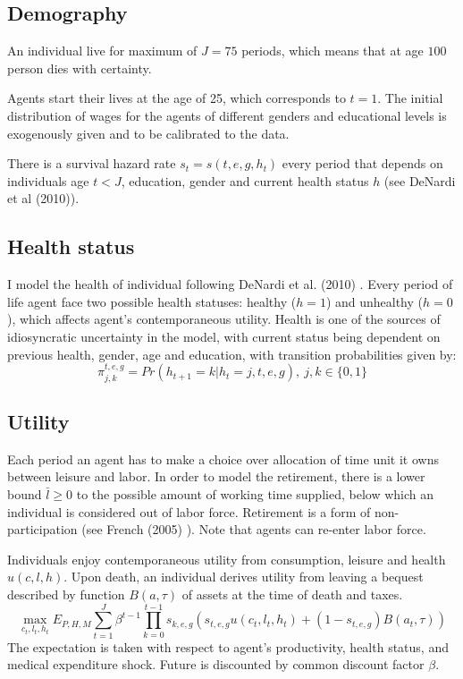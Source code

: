 \documentclass[
10pt, %
a4paper, %
oneside, %
headinclude,footinclude, %
BCOR5mm, %
]{scrartcl}
\begin{document}
\subsection{Demography}
An individual live for maximum of $J = 75$ periods, which means that at age $100$ person dies with certainty.

Agents start their lives at the age of 25, which corresponds to $t = 1$. The initial distribution of wages for the agents of different genders and educational levels is exogenously given and to be calibrated to the data.

 There is a survival hazard rate  $s_t = s(t,e,g,h_t)$ every period that depends on individuals age $t<J$, education, gender and current health status $h$ (see DeNardi et al (2010)\cite{DeNardi2010}). 

\subsection{Health status}
I model the health of individual following DeNardi et al. (2010) \cite{DeNardi2010}. Every period of life agent face two possible health statuses: healthy ($h=1$) and unhealthy ($h=0$), which affects agent's contemporaneous utility. Health is one of the sources of idiosyncratic uncertainty in the model, with current status being dependent on previous health, gender, age and education, with transition probabilities given by:
\begin{equation*}
\pi_{j,k}^{t,e,g} = Pr(h_{t+1} = k|h_t= j, t,e,g), \ j,k\in\{0,1\}
\end{equation*}

\subsection{Utility}
Each period an agent has to make a choice over allocation of time unit it owns between leisure and labor. In order to model the retirement, there is a lower bound $\bar{l}\ge0$ to the possible amount of working time supplied, below which an individual is considered out of labor force. Retirement is a form of non-participation (see French (2005) \cite{French2005}). Note that agents can re-enter labor force. 

 Individuals enjoy contemporaneous utility from consumption, leisure and health $u(c,l,h)$. Upon death, an individual derives utility from leaving a bequest described by function $B(a,\tau)$ of assets at the time of death and taxes.
\begin{equation}
\max_{c_t,l_t,h_t}E_{P,H,M}\sum_{t=1}^J\beta^{t-1}\prod_{k=0}^{t-1}s_{k,e,g}\left(s_{t,e,g}u(c_t,l_t,h_t)+(1-s_{t,e,g})B(a_t,\tau)\right)
\end{equation}
The expectation is taken with respect to agent's productivity, health status, and medical expenditure shock. Future is discounted by common discount factor $\beta$. 
\end{document}
